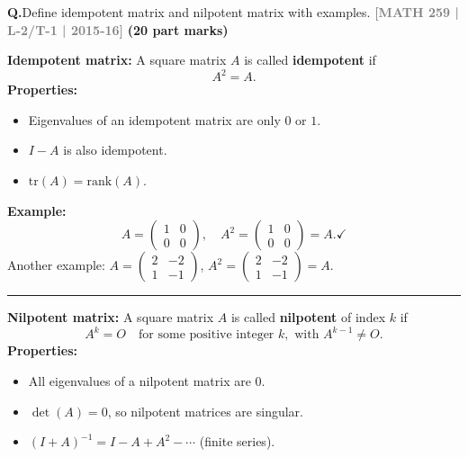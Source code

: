 \documentclass[12pt,a3paper]{article}
\newcommand{\yr}[1]{\hfill\textcolor{gray}{\small\textbf{[#1]}}}
\newcommand{\mk}[1]{\textcolor{orange!70!black}{\small\textbf{(#1 marks)}}}
\newcounter{qnum}
\newcommand{\Q}[1]{%
  \needspace{4\baselineskip}
  \refstepcounter{qnum}
  \vspace{6pt}
  \noindent\textbf{Q\theqnum.}\enspace #1\par
}
\begin{document}
\Q{Define idempotent matrix and nilpotent matrix with examples.
\yr{MATH 259 | L-2/T-1 | 2015-16} \mk{20 part}}

\begin{tcolorbox}[enhanced,breakable,
  colback=cA!4,colframe=cA,boxrule=0.8pt,arc=5pt,
  title={\textbf{Answer --- Idempotent and Nilpotent Matrices}},
  fonttitle=\bfseries\color{white},colbacktitle=cA]
 
\textbf{Idempotent matrix:} A square matrix $A$ is called \textbf{idempotent} if
\[
  A^2 = A.
\]
\textbf{Properties:}
\begin{itemize}[itemsep=2pt]
  \item Eigenvalues of an idempotent matrix are only $0$ or $1$.
  \item $I - A$ is also idempotent.
  \item $\mathrm{tr}(A) = \mathrm{rank}(A)$.
\end{itemize}
 
\textbf{Example:}
\[
  A = \begin{pmatrix}1 & 0 \\ 0 & 0\end{pmatrix}, \quad
  A^2 = \begin{pmatrix}1&0\\0&0\end{pmatrix} = A. \checkmark
\]
Another example: $A = \begin{pmatrix}2 & -2 \\ 1 & -1\end{pmatrix}$,
$A^2 = \begin{pmatrix}2&-2\\1&-1\end{pmatrix} = A$.
 
\medskip
\textcolor{cA}{\rule{\textwidth}{0.4pt}}
 
\textbf{Nilpotent matrix:} A square matrix $A$ is called \textbf{nilpotent} of index $k$ if
\[
  A^k = O \quad \text{for some positive integer } k, \text{ with } A^{k-1}\neq O.
\]
\textbf{Properties:}
\begin{itemize}[itemsep=2pt]
  \item All eigenvalues of a nilpotent matrix are $0$.
  \item $\det(A) = 0$, so nilpotent matrices are singular.
  \item $(I + A)^{-1} = I - A + A^2 - \cdots$ (finite series).
\end{itemize}
 

\end{tcolorbox}
\end{document}

